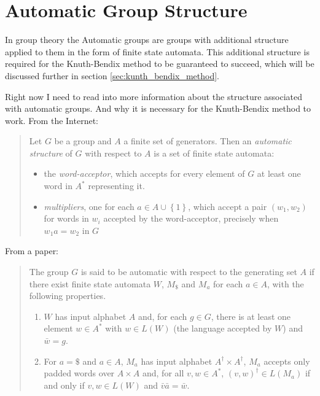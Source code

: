 \documentclass[10pt]{amsart}
\theoremstyle{definition}
\begin{document}
\section{Automatic Group Structure}%
\label{sec:automatic_group_structure}

In group theory the Automatic groups are groups with additional structure
applied to them in the form of finite state automata. This additional structure
is required for the Knuth-Bendix method to be guaranteed to succeed, which will
be discussed further in section \ref{sec:kunth_bendix_method}.

Right now I need to read into more information about the structure associated
with automatic groups. And why it is necessary for the Knuth-Bendix method to
work. From the Internet:

\begin{quote}
  Let $G$ be a group and $A$ a finite set of generators. Then an
  \textit{automatic structure} of $G$ with respect to $A$ is a set of finite
  state automata:
  \begin{itemize}
    \item the \textit{word-acceptor}, which accepts for every element of $G$ at
      least one word in $A^*$ representing it.
    \item \textit{multipliers}, one for each $a\in A\cup\left\{1\right\}$,
      which accept a pair $\left(w_1,w_2\right)$ for words in $w_i$ accepted by the
      word-acceptor, precisely when $w_1a=w_2$ in $G$
  \end{itemize}
\end{quote}

From a paper:

\begin{quote}
  The group $G$ is said to be automatic with respect to the generating set $A$
  if there exist finite state automata $W$, $M_\$$ and $M_a$ for each $a\in A$,
  with the following properties.
  \begin{enumerate}
    \item $W$ has input alphabet $A$ and, for each $g\in G$, there is at least
      one element $w\in A^*$ with $w\in L(W)$ (the language accepted by $W$)
      and $\bar{w}=g$.
    \item For $a=\$$ and $a\in A$, $M_a$ has input alphabet $A^\dagger\times
      A^\dagger$, $M_a$ accepts only padded words over $A\times A$ and, for all
      $v,w\in A^*$, ${(v, w)}^\dagger\in L\left(M_a\right)$ if and only if
      $v,w\in L(W)$ and $\bar{v}\bar{a}=\bar{w}$.
  \end{enumerate}
\end{quote}
\end{document}
